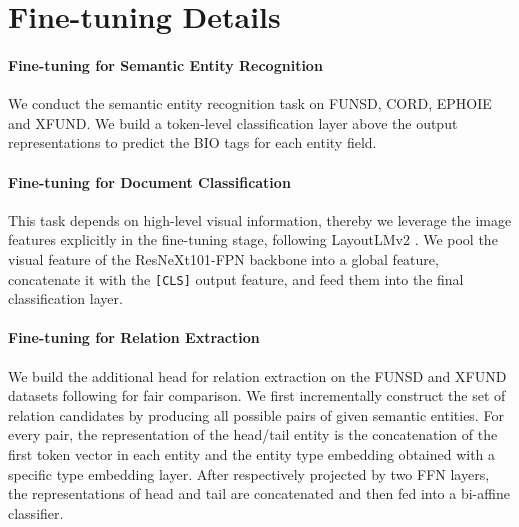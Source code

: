 \documentclass[11pt]{article}
\begin{document}
\section{Fine-tuning Details}\label{app2}
\paragraph{Fine-tuning for Semantic Entity Recognition} We conduct the semantic entity recognition task on FUNSD, CORD, EPHOIE and XFUND. 
We build a token-level classification layer above the output representations to predict the BIO tags for each entity field. 


\paragraph{Fine-tuning for Document Classification}
This task depends on high-level visual information, thereby we leverage the image features explicitly in the fine-tuning stage, following LayoutLMv2 \cite{layoutlmv2}. We pool the visual feature of the ResNeXt101-FPN \cite{resnext,fpn} backbone into a global  feature,
concatenate it with the \texttt{[CLS]} output feature,  and feed them into the final classification layer. 

\paragraph{Fine-tuning for Relation Extraction}
We build the additional  head for relation extraction on the FUNSD and XFUND datasets following \cite{xu2021layoutxlm} for fair comparison. We first incrementally construct the set of relation candidates by producing all possible pairs of given semantic entities. For every pair, the representation of the head/tail entity is the concatenation of the first token vector in each entity and the entity type embedding obtained with a specific type embedding layer. After respectively projected by two FFN layers, the representations of head and tail are concatenated and then fed into a bi-affine classifier. 
\end{document}
